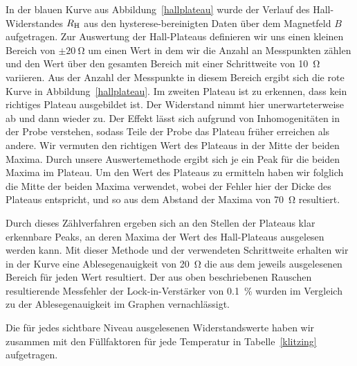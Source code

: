 \documentclass[paper=a4,fontsize=10pt,DIV=18,twocolumn,parskip=half]{scrartcl}
\numberwithin{equation}{section}    %
\newcommand{\kor}[1]{{\color{darkgreen}#1}}
\begin{document}
In der blauen Kurve aus Abbildung~\ref{hallplateau} wurde der Verlauf des Hall-Widerstandes $R_{\rm H}$ aus den hysterese-bereinigten Daten über dem Magnetfeld $B$ aufgetragen.
Zur Auswertung der Hall-Plateaus definieren wir uns einen kleinen Bereich von \kor{$\pm \SI{20}{\ohm}$} um einen \kor{Wert} in dem wir die Anzahl an Messpunkten zählen und den \kor{Wert} über den gesamten Bereich mit einer Schrittweite von \SI{10}{\ohm} variieren. Aus der Anzahl der Messpunkte in diesem Bereich ergibt sich die rote Kurve in Abbildung~\ref{hallplateau}. %
\kor{Im zweiten Plateau ist zu erkennen, dass kein richtiges Plateau ausgebildet ist. Der Widerstand nimmt hier unerwarteterweise ab und dann wieder zu. Der Effekt lässt sich aufgrund von Inhomogenitäten in der Probe verstehen, sodass Teile der Probe das Plateau früher erreichen als andere. Wir vermuten den richtigen Wert des Plateaus in der Mitte der beiden Maxima. Durch unsere Auswertemethode ergibt sich je ein Peak für die beiden Maxima im Plateau. Um den Wert des Plateaus zu ermitteln haben wir folglich die Mitte der beiden Maxima verwendet, wobei der Fehler hier der Dicke des Plateaus entspricht, und so aus dem Abstand der Maxima von \SI{70}{\ohm} resultiert.}

Durch dieses Zählverfahren ergeben sich an den Stellen der Plateaus klar erkennbare Peaks, an deren Maxima der Wert des Hall-Plateaus ausgelesen werden kann. Mit dieser Methode und der verwendeten Schrittweite erhalten wir in der Kurve eine Ablesegenauigkeit von \SI{20}{\ohm} die aus dem jeweils ausgelesenen Bereich für jeden Wert resultiert. \kor{Der aus oben beschriebenen Rauschen resultierende Messfehler der Lock-in-Verstärker von \SI{0.1}{\percent} wurden im Vergleich zu der Ablesegenauigkeit im Graphen vernachlässigt. }

Die für jedes sichtbare Niveau ausgelesenen Widerstandswerte haben wir zusammen mit den Füllfaktoren für jede Temperatur in Tabelle~\ref{klitzing} aufgetragen.
\end{document}

